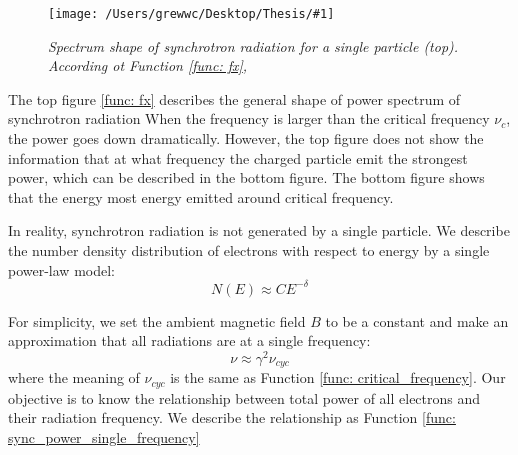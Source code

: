 \documentclass[12pt]{report}
\newcommand{\mycaption}[1]{\caption{\textit{\footnotesize #1}}}
\newcommand{\singleFig}[3]{
 \begin{figure}[!ht]
  \centering
  \texttt{[image: /Users/grewwc/Desktop/Thesis/\#1]}
  \mycaption{#3}
 \label{fig: #1}
 \end{figure}
}
\begin{document}
            \singleFig{sync_spectrum_loglog_combined}{0.5}{Spectrum shape of synchrotron radiation for a single 
              particle (top). 
             According ot Function \ref{func: fx},}

            The top figure \ref{func: fx} describes the general shape of power spectrum of synchrotron radiation
            When the frequency is larger than
            the critical frequency $\nu_c$, the power goes down dramatically. However, the top figure does not show 
            the information that at what frequency the charged particle emit the strongest power, which can be described
            in the bottom figure. The bottom figure shows that the energy most energy emitted around critical frequency. 
  
            In reality, synchrotron radiation is not generated by a single particle. We describe the number 
            density distribution of electrons with respect to energy by a single power-law model:
            \begin{equation}
              \label{func: sync_number_density}
              N\left(E\right) \approx C E^{-\delta}
            \end{equation}
          
            For simplicity, we set the ambient magnetic field $B$ to be a constant and make an approximation 
            that all radiations are at a single frequency:
            \begin{equation}
              \label{func: sync_approximation}
              \nu \approx \gamma^2 \nu_{cyc}
            \end{equation}
            where the meaning of $\nu_{cyc}$ is the same as Function \ref{func: critical_frequency}. 
            Our objective is to know the relationship between total power of all electrons and their radiation 
            frequency. We describe the relationship as Function \ref{func: sync_power_single_frequency}
            
\end{document}
